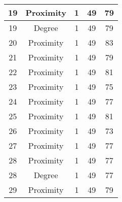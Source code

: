 \documentclass[results.tex]{subfiles}
\begin{document}
\begin{center}
\begin{tabular}{| c || c | c | c | c |}
            \hline
            19                      & Proximity                    & 1                      & 49                      & 79                   \\
            \hline
            19                      & Degree                       & 1                      & 49                      & 79                   \\
            \hline
            20                      & Proximity                    & 1                      & 49                      & 83                   \\
            \hline
            21                      & Proximity                    & 1                      & 49                      & 79                   \\
            \hline
            22                      & Proximity                    & 1                      & 49                      & 81                   \\
            \hline
            23                      & Proximity                    & 1                      & 49                      & 75                   \\
            \hline
            24                      & Proximity                    & 1                      & 49                      & 77                   \\
            \hline
            25                      & Proximity                    & 1                      & 49                      & 81                   \\
            \hline
            26                      & Proximity                    & 1                      & 49                      & 73                   \\
            \hline
            27                      & Proximity                    & 1                      & 49                      & 77                   \\
            \hline
            28                      & Proximity                    & 1                      & 49                      & 77                   \\
            \hline
            28                      & Degree                       & 1                      & 49                      & 77                   \\
            \hline
            29                      & Proximity                    & 1                      & 49                      & 79                   \\

\end{tabular}
\end{center}
\end{document}
